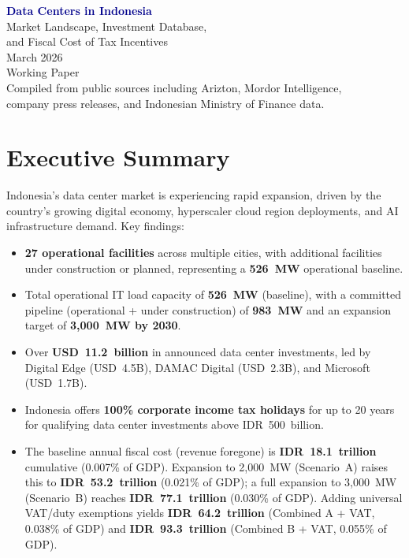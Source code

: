 \documentclass[11pt,a4paper]{article}
\begin{document}
\begin{titlepage}
\centering
\vspace*{3cm}
{\Huge\bfseries\textcolor{darkblue}{Data Centers in Indonesia}\\[0.5cm]}
{\LARGE\textcolor{accentred}{Market Landscape, Investment Database,\\and Fiscal Cost of Tax Incentives}\\[2cm]}
{\Large March 2026\\[1cm]}
\vfill
{\large Working Paper}\\[0.5cm]
{\small Compiled from public sources including Arizton, Mordor Intelligence,\\
company press releases, and Indonesian Ministry of Finance data.}
\end{titlepage}

\tableofcontents
\newpage

\section{Executive Summary}

Indonesia's data center market is experiencing rapid expansion, driven by the country's growing digital economy, hyperscaler cloud region deployments, and AI infrastructure demand. Key findings:

\begin{itemize}[leftmargin=*]
    \item \textbf{27 operational facilities} across multiple cities, with additional facilities under construction or planned, representing a \textbf{526~MW} operational baseline.
    \item Total operational IT load capacity of \textbf{526~MW} (baseline), with a committed pipeline (operational + under construction) of \textbf{983~MW} and an expansion target of \textbf{3,000~MW by 2030}.
    \item Over \textbf{USD~11.2~billion} in announced data center investments, led by Digital Edge (USD~4.5B), DAMAC Digital (USD~2.3B), and Microsoft (USD~1.7B).
    \item Indonesia offers \textbf{100\% corporate income tax holidays} for up to 20 years for qualifying data center investments above IDR~500~billion.
    \item The baseline annual fiscal cost (revenue foregone) is \textbf{IDR~18.1~trillion} cumulative (0.007\% of GDP). Expansion to 2,000~MW (Scenario~A) raises this to \textbf{IDR~53.2~trillion} (0.021\% of GDP); a full expansion to 3,000~MW (Scenario~B) reaches \textbf{IDR~77.1~trillion} (0.030\% of GDP). Adding universal VAT/duty exemptions yields \textbf{IDR~64.2~trillion} (Combined A + VAT, 0.038\% of GDP) and \textbf{IDR~93.3~trillion} (Combined B + VAT, 0.055\% of GDP).
\end{itemize}
\end{document}

